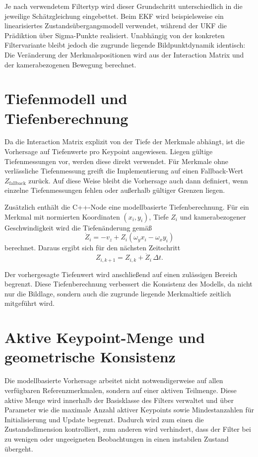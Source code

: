 Je nach verwendetem Filtertyp wird dieser Grundschritt unterschiedlich in die jeweilige Schätzgleichung eingebettet. Beim \ac{EKF} wird beispielsweise ein linearisiertes Zustandsübergangsmodell verwendet, während der \ac{UKF} die Prädiktion über Sigma-Punkte realisiert. Unabhängig von der konkreten Filtervariante bleibt jedoch die zugrunde liegende Bildpunktdynamik identisch: Die Veränderung der Merkmalspositionen wird aus der Interaction Matrix und der kamerabezogenen Bewegung berechnet.

\section{Tiefenmodell und Tiefenberechnung}
\label{sec:tiefenmodell_tiefenberechnung}

Da die Interaction Matrix explizit von der Tiefe der Merkmale abhängt, ist die Vorhersage auf Tiefenwerte pro Keypoint angewiesen. Liegen gültige Tiefenmessungen vor, werden diese direkt verwendet. Für Merkmale ohne verlässliche Tiefenmessung greift die Implementierung auf einen Fallback-Wert \(Z_{\mathrm{fallback}}\) zurück. Auf diese Weise bleibt die Vorhersage auch dann definiert, wenn einzelne Tiefenmessungen fehlen oder außerhalb gültiger Grenzen liegen.

Zusätzlich enthält die C++-Node eine modellbasierte Tiefenberechnung. Für ein Merkmal mit normierten Koordinaten \((x_i,y_i)\), Tiefe \(Z_i\) und kamerabezogener Geschwindigkeit wird die Tiefenänderung gemäß
\begin{equation}
\dot{Z}_i = -v_z + Z_i \left( \omega_y x_i - \omega_x y_i \right)
\end{equation}
berechnet. Daraus ergibt sich für den nächsten Zeitschritt
\begin{equation}
Z_{i,k+1} = Z_{i,k} + \dot{Z}_i \, \Delta t.
\end{equation}

Der vorhergesagte Tiefenwert wird anschließend auf einen zulässigen Bereich begrenzt. Diese Tiefenberechnung verbessert die Konsistenz des Modells, da nicht nur die Bildlage, sondern auch die zugrunde liegende Merkmaltiefe zeitlich mitgeführt wird.

\section{Aktive Keypoint-Menge und geometrische Konsistenz}
\label{sec:aktive_keypoint_menge_geometrische_konsistenz}

Die modellbasierte Vorhersage arbeitet nicht notwendigerweise auf allen verfügbaren Referenzmerkmalen, sondern auf einer aktiven Teilmenge. Diese aktive Menge wird innerhalb der Basisklasse des Filters verwaltet und über Parameter wie die maximale Anzahl aktiver Keypoints sowie Mindestanzahlen für Initialisierung und Update begrenzt. Dadurch wird zum einen die Zustandsdimension kontrolliert, zum anderen wird verhindert, dass der Filter bei zu wenigen oder ungeeigneten Beobachtungen in einen instabilen Zustand übergeht.

